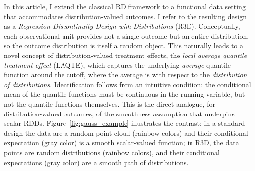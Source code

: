 \documentclass[12pt]{article}
\begin{document}
\begin{table}[htbp!]
 
\caption{R3D-Like Settings in Top Journals (2014--2024)} \label{tab:publications}
\end{table}

In this article, I extend the classical RD framework to a functional data setting that accommodates distribution-valued outcomes. I refer to the resulting design as a \emph{Regression Discontinuity Design with Distributions} (R3D). Conceptually, each observational unit provides not a single outcome but an entire distribution, so the outcome distribution is itself a random object. This naturally leads to a novel concept of distribution-valued treatment effects, the \emph{local average quantile treatment effect} (LAQTE), which captures the underlying \emph{average} quantile function around the cutoff, where the average is with respect to the \textit{distribution of distributions}.  Identification follows from an intuitive condition: the conditional mean of the quantile functions must be continuous in the running variable, but not the quantile functions themselves. This is the direct analogue, for distribution-valued outcomes, of the smoothness assumption that underpins scalar RDDs. Figure~\ref{fig:gauss_example} illustrates the contrast: in a standard design the data are a random point cloud (rainbow colors) and their conditional expectation (gray color) is a smooth scalar-valued function; in R3D, the data points are random distributions (rainbow colors), and their conditional expectations (gray color) are a smooth path of distributions. 
\end{document}
